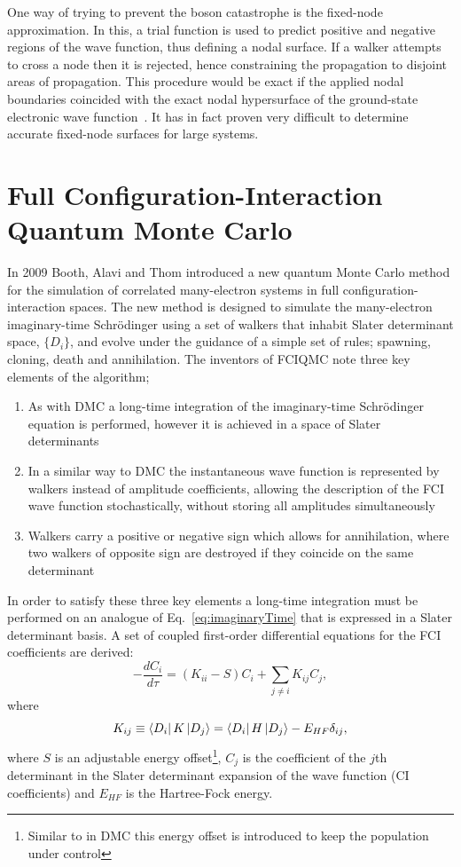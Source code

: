 One way of trying to prevent the boson catastrophe  is the fixed-node approximation\cite{Foulkes2001,BajdichMichalandMitas2009}. In this, a trial function is used to predict positive and negative regions of the wave function, thus defining a nodal surface. If a walker attempts to cross a node then it is rejected, hence constraining the propagation to disjoint areas of propagation. This procedure would be exact if the applied nodal boundaries coincided with the exact nodal hypersurface of the ground-state electronic wave function~\cite{Booth2009}. It has in fact proven very difficult to determine accurate fixed-node surfaces for large systems. 

\section*{Full Configuration-Interaction Quantum Monte Carlo}
In 2009 Booth, Alavi and Thom \cite{Booth2009} introduced a new quantum Monte Carlo method for the simulation of correlated many-electron systems in full configuration-interaction spaces. The new method is designed to simulate the many-electron imaginary-time Schr\"{o}dinger using a set of walkers that inhabit Slater determinant space, $\{D_i \}$, and evolve under the guidance of a simple set of rules; spawning, cloning, death and annihilation. The inventors of FCIQMC note three key elements of the algorithm;
\begin{enumerate}
\item As with DMC a long-time integration of the imaginary-time Schr\"{o}dinger equation is performed, however it is achieved in a space of Slater determinants
\item In a similar way to DMC the instantaneous wave function is represented by walkers instead of amplitude coefficients, allowing the description of the FCI wave function stochastically, without storing all amplitudes simultaneously
\item Walkers carry a positive or negative sign which allows for annihilation, where two walkers of opposite sign are destroyed if they coincide on the same determinant
\end{enumerate}

In order to satisfy these three key elements a long-time integration must be performed on an analogue of Eq.~\ref{eq:imaginaryTime} that is expressed in a Slater determinant basis. A set of coupled first-order differential equations for the FCI coefficients are derived\cite{Booth2009}:
\begin{equation}
\label{eq:schrodingerSlaterSpace}
-\frac{dC_i}{d\tau} = (K_{ii}-S)C_i + \sum_{j\neq i}K_{ij}C_j,
\end{equation}
where
\begin{equation}
\label{eq:KMatrixElements}
K_{ij} \equiv \Bra{D_i} K \Ket{D_j} = \Bra{D_i} H\Ket{D_j}-E_{HF}\delta_{ij},
\end{equation}
where $S$ is an adjustable energy offset\footnote{Similar to in DMC this energy offset is introduced to keep the population under control}, $C_j$ is the coefficient of the $j$th determinant in the Slater determinant expansion of the wave function (CI coefficients) and $E_{HF}$ is the Hartree-Fock energy. 

